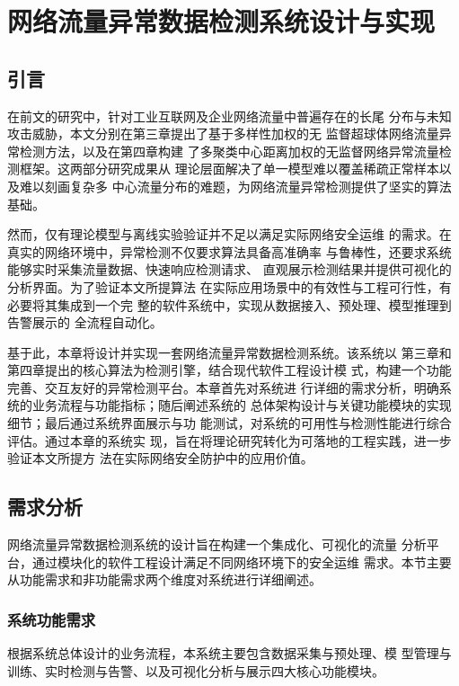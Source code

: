 \chapter{网络流量异常数据检测系统设计与实现}

\section{引言}
在前文的研究中，针对工业互联网及企业网络流量中普遍存在的长尾
分布与未知攻击威胁，本文分别在第三章提出了基于多样性加权的无
监督超球体网络流量异常检测方法，以及在第四章构建
了多聚类中心距离加权的无监督网络异常流量检测框架。这两部分研究成果从
理论层面解决了单一模型难以覆盖稀疏正常样本以及难以刻画复杂多
中心流量分布的难题，为网络流量异常检测提供了坚实的算法基础。

然而，仅有理论模型与离线实验验证并不足以满足实际网络安全运维
的需求。在真实的网络环境中，异常检测不仅要求算法具备高准确率
与鲁棒性，还要求系统能够实时采集流量数据、快速响应检测请求、
直观展示检测结果并提供可视化的分析界面。为了验证本文所提算法
在实际应用场景中的有效性与工程可行性，有必要将其集成到一个完
整的软件系统中，实现从数据接入、预处理、模型推理到告警展示的
全流程自动化。

基于此，本章将设计并实现一套网络流量异常数据检测系统。该系统以
第三章和第四章提出的核心算法为检测引擎，结合现代软件工程设计模
式，构建一个功能完善、交互友好的异常检测平台。本章首先对系统进
行详细的需求分析，明确系统的业务流程与功能指标；随后阐述系统的
总体架构设计与关键功能模块的实现细节；最后通过系统界面展示与功
能测试，对系统的可用性与检测性能进行综合评估。通过本章的系统实
现，旨在将理论研究转化为可落地的工程实践，进一步验证本文所提方
法在实际网络安全防护中的应用价值。

\section{需求分析}
网络流量异常数据检测系统的设计旨在构建一个集成化、可视化的流量
分析平台，通过模块化的软件工程设计满足不同网络环境下的安全运维
需求。本节主要从功能需求和非功能需求两个维度对系统进行详细阐述。

\subsection{系统功能需求}

根据系统总体设计的业务流程，本系统主要包含数据采集与预处理、模
型管理与训练、实时检测与告警、以及可视化分析与展示四大核心功能模块。


